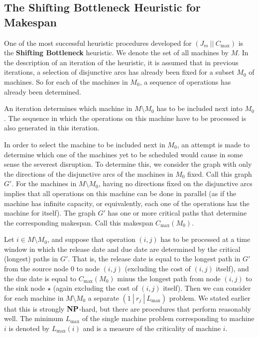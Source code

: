 \subsection{The Shifting Bottleneck Heuristic for Makespan} \label{subsec:9.2}
One of the most successful heuristic procedures developed for $(J_m~||~C_{\max})$ 
is the {\bf Shifting Bottleneck} heuristic. We denote the set of all 
machines by $M$. In the description of an iteration of the heuristic, 
it is assumed that in previous iterations, a selection of disjunctive 
arcs has already been fixed for a subset $M_0$ of machines. So for each 
of the machines in $M_0$, a sequence of operations has already been determined. 

An iteration determines which machine in $M \setminus M_0$ has to be included 
next into $M_0$. The sequence in which the operations on this machine 
have to be processed is also generated in this iteration. 

In order to select the machine to be included next in $M_0$, an attempt is 
made to determine which one of the machines yet to be scheduled would cause in 
some sense the severest disruption. To determine this, we consider the 
graph with only the directions of the disjunctive arcs of the machines in $M_0$
fixed. Call this graph $G'$. For the machines in $M \setminus M_0$, having 
no directions fixed on the disjunctive arcs implies that all operations 
on this machine can be done in parallel (as if the machine has infinite 
capacity, or equivalently, each one of the operations has the machine 
for itself). The graph $G'$ has one or more critical paths that determine 
the corresponding makespan. Call this makespan $C_{\max}(M_0)$. 

Let $i \in M \setminus M_0$, and suppose that operation $(i, j)$ has to be 
processed at a time window in which the release date and due date are 
determined by the critical (longest) paths in $G'$. That is, the 
release date is equal to the longest path in $G'$ from the source node $0$ 
to node $(i, j)$ (excluding the cost of $(i, j)$ itself), and the 
due date is equal to $C_{\max}(M_0)$ minus the longest path from 
node $(i, j)$ to the sink node $\star$ (again excluding the cost of 
$(i, j)$ itself). Then we can consider for each machine in $M \setminus M_0$ 
a separate $(1~|~r_j~|~L_{\max})$ problem. We stated earlier that this 
is strongly $\operatorname{\textbf{NP}}$-hard, but there are procedures that perform reasonably well.
The minimum $L_{\max}$ of the single machine problem corresponding to 
machine $i$ is denoted by $L_{\max}(i)$ and is a measure of the criticality of 
machine $i$. 

